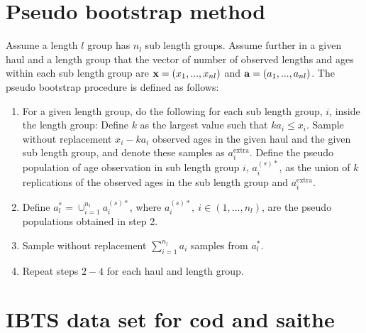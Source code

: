 \documentclass[a4paper 12pt]{article}
\numberwithin{equation}{section}
\begin{document}
\section{Pseudo bootstrap method}
\label{secAp:pseudobootstrap}
Assume a length $l$ group has $n_{l}$ sub length groups. Assume further in a given haul and a length group that the vector of number of observed lengths and ages within each sub length group are ${\bf x} = \left(x_{1},...,x_{nl}\right)$ and ${\bf a} = \left(a_{1},...,a_{nl}\right)$.  The pseudo bootstrap procedure is defined as follows:

\begin{enumerate}
\item For a given length group, do the following for each sub length group, $i$, inside the length group: Define $k$ as the largest value such that $ka_{i} \leq x_{i}$. Sample without replacement $x_{i} - k a_{i}$ observed ages in the given haul and the given sub length group, and denote these samples as $a^{\mathrm{extra}}_{i}$. Define the pseudo population of age observation in sub length group $i$, $a^{(s)*}_{i}$, as the union of $k$ replications of the observed ages in the sub length group and $a^{\mathrm{extra}}_{i}$.

\item Define $a^{*}_{l} = \cup_{i = 1}^{n_{l}} a^{(s)*}_{i} $, where $a^{(s)*}_{i}, \ i \in \left(1,...,n_{l} \right)$, are the pseudo populations obtained in step 2.

\item Sample without replacement $\sum_{i = 1}^{n_{l}} a_{i}$ samples from $a^{*}_{l} $.

\item Repeat steps $2-4$ for each haul and length group.
\end{enumerate}


\section{\large IBTS data set for cod and saithe}
\label{secAp:data}
\end{document}
